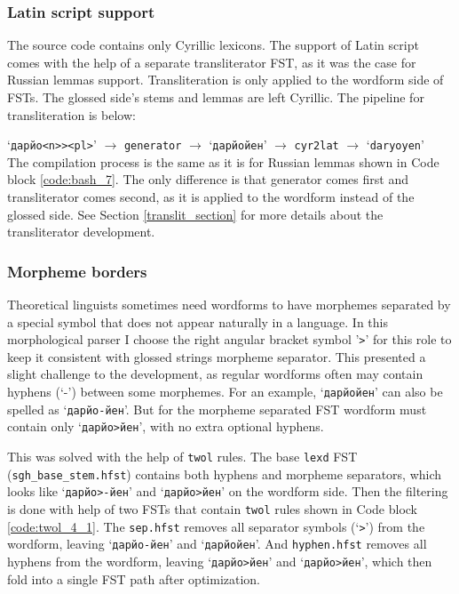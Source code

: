 \subsubsection*{Latin script support}
The source code contains only Cyrillic lexicons. The support of Latin script comes with the help of a separate transliterator FST, as it was the case for Russian lemmas support. Transliteration is only applied to the wordform side of FSTs. The glossed side's stems and lemmas are left Cyrillic. The pipeline for transliteration is below:

\vspace*{0.3cm}
\noindent `\texttt{дарйо<n>><pl>}' $\rightarrow$ \texttt{generator} $\rightarrow$ `\texttt{дарйойен}' $\rightarrow$ \texttt{cyr2lat} $\rightarrow$ `\texttt{daryoyen}'\\

The compilation process is the same as it is for Russian lemmas shown in Code block \ref{code:bash_7}. The only difference is that generator comes first and transliterator comes second, as it is applied to the wordform instead of the glossed side. See Section \ref{translit_section} for more details about the transliterator development.

\subsubsection*{Morpheme borders} \label{morpheme_borders}
Theoretical linguists sometimes need wordforms to have morphemes separated by a special symbol that does not appear naturally in a language. In this morphological parser I choose the right angular bracket symbol '\texttt{>}' for this role to keep it consistent with glossed strings morpheme separator. This presented a slight challenge to the development, as regular wordforms often may contain hyphens (`-') between some morphemes. For an example, `\texttt{дарйойен}' can also be spelled as `\texttt{дарйо-йен}'. But for the morpheme separated FST wordform must contain only `\texttt{дарйо>йен}', with no extra optional hyphens. 

This was solved with the help of \texttt{twol} rules. The base \texttt{lexd} FST (\texttt{sgh\_base\_stem.hfst}) contains both hyphens and morpheme separators, which looks like `\texttt{дарйо>-йен}' and `\texttt{дарйо>йен}' on the wordform side. Then the filtering is done with help of two FSTs that contain \texttt{twol} rules shown in Code block \ref{code:twol_4_1}. The \texttt{sep.hfst} removes all separator symbols (`\texttt{>}') from the wordform, leaving `\texttt{дарйо-йен}' and `\texttt{дарйойен}'. And \texttt{hyphen.hfst} removes all hyphens from the wordform, leaving `\texttt{дарйо>йен}' and `\texttt{дарйо>йен}', which then fold into a single FST path after optimization.

